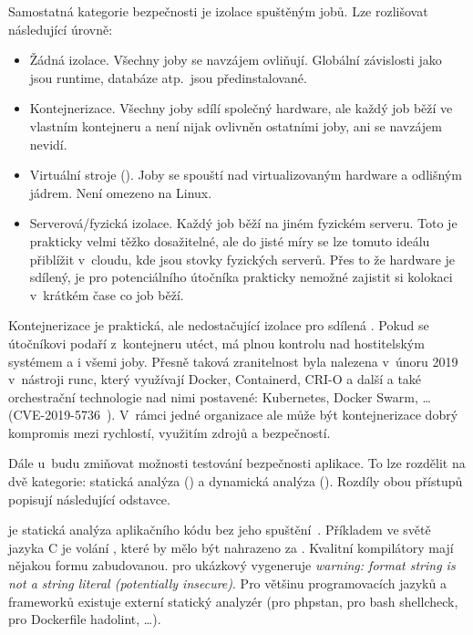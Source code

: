         Samostatná kategorie bezpečnosti \CI je izolace spuštěným jobů. Lze rozlišovat následující úrovně:
        \begin{itemize}
            \item Žádná izolace. Všechny joby se navzájem ovliňují. Globální závislosti jako jsou runtime, databáze atp.~jsou předinstalované.
            \item Kontejnerizace. Všechny joby sdílí společný hardware, ale každý job běží ve vlastním kontejneru a není nijak ovlivněn ostatními joby, ani se navzájem nevidí.
            \item Virtuální stroje (). Joby se spouští nad virtualizovaným hardware a odlišným jádrem. Není omezeno na Linux.
            \item Serverová/fyzická izolace. Každý job běží na jiném fyzickém serveru. Toto je prakticky velmi těžko dosažitelné, ale do jisté míry se lze tomuto ideálu přiblížit v~cloudu, kde jsou stovky fyzických serverů. Přes to že hardware je sdílený, je pro potenciálního útočníka prakticky nemožné zajistit si kolokaci v~krátkém čase co job běží.
        \end{itemize}

        Kontejnerizace je praktická, ale nedostačující izolace pro sdílená \CI. Pokud se útočníkovi podaří z~kontejneru utéct, má plnou kontrolu nad hostitelským systémem a i všemi joby. Přesně taková zranitelnost byla nalezena v~únoru 2019 v~nástroji runc, který využívají Docker, Containerd, CRI-O a další a také orchestrační technologie nad nimi postavené: Kubernetes, Docker Swarm, … (CVE-2019-5736~\cite{CVE-2019-5736}). V~rámci jedné organizace ale může být kontejnerizace dobrý kompromis mezi rychlostí, využitím zdrojů a bezpečností.

        Dále u~\CI budu zmiňovat možnosti testování bezpečnosti aplikace. To lze rozdělit na dvě kategorie: statická analýza () a dynamická analýza (). Rozdíly obou přístupů popisují následující odstavce.

        \label{sast-dast}
         je statická analýza aplikačního kódu bez jeho spuštění~\cite{sast}. Příkladem ve světě jazyka C je volání , které by mělo být nahrazeno za . Kvalitní kompilátory mají nějakou formu  zabudovanou.  pro ukázkový  vygeneruje \textit{warning: format string is not a string literal (potentially insecure)}. Pro většinu programovacích jazyků a frameworků existuje externí statický analyzér (pro  phpstan, pro bash shellcheck, pro Dockerfile hadolint, …).

